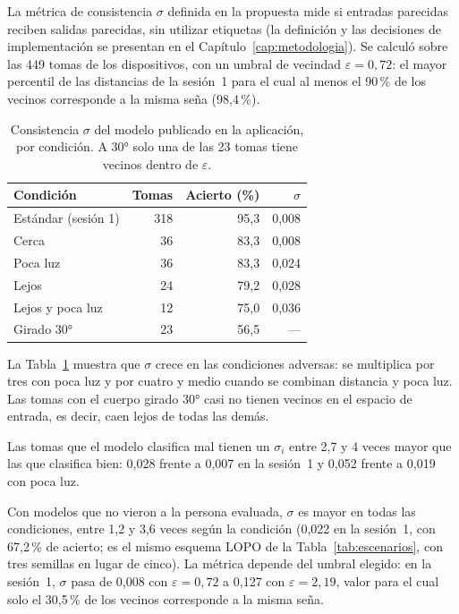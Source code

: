 La métrica de consistencia $\sigma$ definida en la propuesta mide si entradas parecidas reciben salidas parecidas, sin utilizar etiquetas (la definición y las decisiones de implementación se presentan en el Capítulo~\ref{cap:metodologia}). Se calculó sobre las 449 tomas de los dispositivos, con un umbral de vecindad $\varepsilon = 0{,}72$: el mayor percentil de las distancias de la sesión~1 para el cual al menos el 90\,\% de los vecinos corresponde a la misma seña (98,4\,\%).

\begin{table}[h]
    \centering
    \begin{tabular}{lrrr}
        \toprule
        Condición & Tomas & Acierto (\%) & $\sigma$ \\
        \midrule
        Estándar (sesión 1) & 318 & 95,3 & 0,008 \\
        Cerca & 36 & 83,3 & 0,008 \\
        Poca luz & 36 & 83,3 & 0,024 \\
        Lejos & 24 & 79,2 & 0,028 \\
        Lejos y poca luz & 12 & 75,0 & 0,036 \\
        Girado 30° & 23 & 56,5 & --- \\
        \bottomrule
    \end{tabular}
    \caption{Consistencia $\sigma$ del modelo publicado en la aplicación, por condición. A 30° solo una de las 23 tomas tiene vecinos dentro de $\varepsilon$.}
    \label{tab:sigma}
\end{table}

La Tabla~\ref{tab:sigma} muestra que $\sigma$ crece en las condiciones adversas: se multiplica por tres con poca luz y por cuatro y medio cuando se combinan distancia y poca luz. Las tomas con el cuerpo girado 30° casi no tienen vecinos en el espacio de entrada, es decir, caen lejos de todas las demás.

Las tomas que el modelo clasifica mal tienen un $\sigma_i$ entre 2,7 y 4 veces mayor que las que clasifica bien: 0,028 frente a 0,007 en la sesión~1 y 0,052 frente a 0,019 con poca luz.

Con modelos que no vieron a la persona evaluada, $\sigma$ es mayor en todas las condiciones, entre 1,2 y 3,6 veces según la condición (0,022 en la sesión~1, con 67,2\,\% de acierto; es el mismo esquema LOPO de la Tabla~\ref{tab:escenarios}, con tres semillas en lugar de cinco). La métrica depende del umbral elegido: en la sesión~1, $\sigma$ pasa de 0,008 con $\varepsilon = 0{,}72$ a 0,127 con $\varepsilon = 2{,}19$, valor para el cual solo el 30,5\,\% de los vecinos corresponde a la misma seña.

